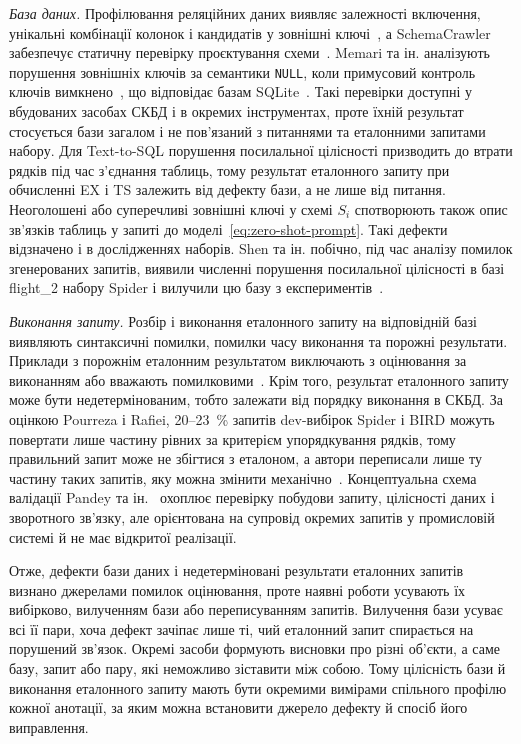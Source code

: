 \documentclass[a4paper,14pt,oneside]{extreport}
\begin{document}
\textit{База даних.}
Профілювання реляційних даних виявляє залежності включення, унікальні комбінації колонок і кандидатів у зовнішні ключі~\cite{abedjan2015profiling}, а SchemaCrawler забезпечує статичну перевірку проєктування схеми~\cite{schemacrawler}. Memari та ін. аналізують порушення зовнішніх ключів за семантики \texttt{NULL}, коли примусовий контроль ключів вимкнено~\cite{memari2015sql}, що відповідає базам SQLite~\cite{sqliteForeignKeys}. Такі перевірки доступні у вбудованих засобах СКБД і в окремих інструментах, проте їхній результат стосується бази загалом і не пов'язаний з питаннями та еталонними запитами набору. Для Text-to-SQL порушення посилальної цілісності призводить до втрати рядків під час з'єднання таблиць, тому результат еталонного запиту при обчисленні EX і TS залежить від дефекту бази, а не лише від питання. Неоголошені або суперечливі зовнішні ключі у схемі \(S_i\) спотворюють також опис зв'язків таблиць у запиті до моделі~\eqref{eq:zero-shot-prompt}. Такі дефекти відзначено і в дослідженнях наборів. Shen та ін. побічно, під час аналізу помилок згенерованих запитів, виявили численні порушення посилальної цілісності в базі flight\_2 набору Spider і вилучили цю базу з експериментів~\cite{shen2026mapledoctor}.

\textit{Виконання запиту.}
Розбір і виконання еталонного запиту на відповідній базі виявляють синтаксичні помилки, помилки часу виконання та порожні результати. Приклади з порожнім еталонним результатом виключають з оцінювання за виконанням або вважають помилковими~\cite{zhong2020testsuites,mitsopoulou2025analysis}. Крім того, результат еталонного запиту може бути недетермінованим, тобто залежати від порядку виконання в СКБД. За оцінкою Pourreza і Rafiei, 20--23~\% запитів dev-вибірок Spider і BIRD можуть повертати лише частину рівних за критерієм упорядкування рядків, тому правильний запит може не збігтися з еталоном, а автори переписали лише ту частину таких запитів, яку можна змінити механічно~\cite{pourreza2023evaluating}. Концептуальна схема валідації Pandey та ін.~\cite{pandey2024validation} охоплює перевірку побудови запиту, цілісності даних і зворотного зв'язку, але орієнтована на супровід окремих запитів у промисловій системі й не має відкритої реалізації.

Отже, дефекти бази даних і недетерміновані результати еталонних запитів визнано джерелами помилок оцінювання, проте наявні роботи усувають їх вибірково, вилученням бази або переписуванням запитів. Вилучення бази усуває всі її пари, хоча дефект зачіпає лише ті, чий еталонний запит спирається на порушений зв'язок. Окремі засоби формують висновки про різні об'єкти, а саме базу, запит або пару, які неможливо зіставити між собою. Тому цілісність бази й виконання еталонного запиту мають бути окремими вимірами спільного профілю кожної анотації, за яким можна встановити джерело дефекту й спосіб його виправлення.
\end{document}

